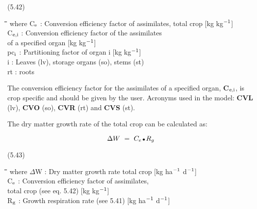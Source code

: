 \strut\hfill (5.42)\nwln
\begin{tabbing}
\hspace{1.27cm}\=\hspace{1.27cm}\=\hspace{1.27cm}\=\hspace{1.27cm}\=%
\hspace{1.27cm}\=\hspace{1.27cm}\=\hspace{1.27cm}\=\hspace{1.27cm}\=%
\hspace{1.27cm}\=\hspace{1.27cm}\=\kill
where C$_{{\rm e}}$ : Conversion efficiency factor of assimilates, total crop        [kg kg$^{{\rm -1}}$]\\
C$_{{\rm e,i}}$ : Conversion efficiency factor of the assimilates \\
   of a specified organ        [kg kg$^{{\rm -1}}$]\\
pc$_{{\rm i}}$ : Partitioning factor of organ i        [kg kg$^{{\rm -1}}$]\\
i : Leaves (lv), storage organs (so), stems (st)\\
rt : roots
\end{tabbing}



The conversion efficiency factor for the assimilates of a specified organ, {\bf C$_{{\rm e,i}}$}, is crop
specific and should be given by the user. Acronyms used in the model: {\bf CVL} (lv), {\bf CVO}
(so), {\bf CVR} (rt) and {\bf CVS} (st).



The dry matter growth rate of the total crop can be calculated as:

\begin{displaymath}
\Delta W~=~ C _{e} \, {\rm \Bullet{0.75ex}}\, R _{g} 
\end{displaymath}

 
\strut\hfill (5.43)
\nwln
\begin{tabbing}
\hspace{1.27cm}\=\hspace{1.27cm}\=\hspace{1.27cm}\=\hspace{1.27cm}\=%
\hspace{1.27cm}\=\hspace{1.27cm}\=\hspace{1.27cm}\=\hspace{1.27cm}\=%
\hspace{1.27cm}\=\hspace{1.27cm}\=\kill
where $\Delta$W : Dry matter growth rate total crop        [kg ha$^{{\rm -1}}$ d$^{{\rm -1}}$]\\
C$_{{\rm e}}$ : Conversion efficiency factor of assimilates, \\
   total crop (see eq. 5.42)        [kg kg$^{{\rm -1}}$] \\
R$_{{\rm g}}$ : Growth respiration rate (see 5.41)        [kg ha$^{{\rm -1}}$ d$^{{\rm -1}}$]
\end{tabbing}



